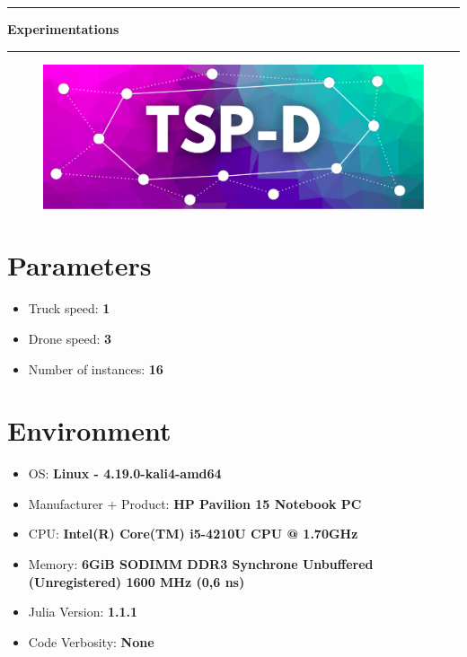 \documentclass{article}
\begin{document}
\hrule
\begin{center}
\Large{\textbf{Experimentations}}
\vspace{0.1mm}
\end{center}
\hrule \vspace{8mm}

\vspace{4mm}\begin{figure}[H]
\center
\includegraphics[scale=0.22]{logo/logo+.png}
\end{figure}

\vspace{5mm}
\section{Parameters}

\begin{itemize}
    \item Truck speed: \textbf{1}
    \item Drone speed: \textbf{3}
    \item Number of instances: \textbf{16}

\end{itemize}

\vspace{5mm}
\section{Environment}

\begin{itemize}
    \item OS: \textbf{Linux
 - 4.19.0-kali4-amd64
}
    \item Manufacturer + Product: \textbf{HP Pavilion 15 Notebook PC 
}
    \item CPU: \textbf{Intel(R) Core(TM) i5-4210U CPU @ 1.70GHz
}
    \item Memory: \textbf{6GiB
 SODIMM DDR3 Synchrone Unbuffered (Unregistered) 1600 MHz (0,6 ns)
}
    \item Julia Version: \textbf{1.1.1}
    \item Code Verbosity: \textbf{None}

\end{itemize}
\end{document}
